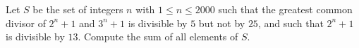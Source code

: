 Let $S$ be the set of integers $n$ with $1\leq n\leq 2000$ such that the greatest common divisor of $2^n+1$ and $3^n+1$ is divisible by $5$ but not by $25$, and such that $2^n+1$ is divisible by $13$. Compute the sum of all elements of $S$.

